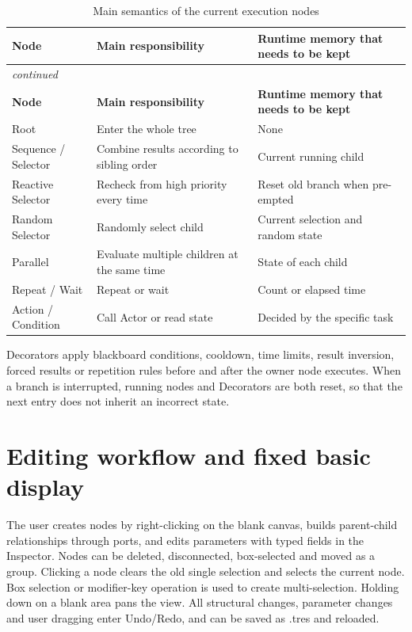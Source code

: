 \documentclass[11pt,a4paper,oneside,extrafontsizes]{memoir}
\begin{document}
\begin{center}

\begin{longtable}{@{}p{} p{} p{}@{}}
\caption{Main semantics of the current execution nodes}\label{tab:runtime-node-semantics}\\
\toprule
\textbf{Node} & \textbf{Main responsibility} & \textbf{Runtime memory that needs to be kept} \\
\midrule
\endfirsthead
\multicolumn{3}{l}{\itshape continued}\\
\toprule
\textbf{Node} & \textbf{Main responsibility} & \textbf{Runtime memory that needs to be kept} \\
\midrule
\endhead
Root & Enter the whole tree & None \\
Sequence / Selector & Combine results according to sibling order & Current running child \\
Reactive Selector & Recheck from high priority every time & Reset old branch when pre-empted \\
Random Selector & Randomly select child & Current selection and random state \\
Parallel & Evaluate multiple children at the same time & State of each child \\
Repeat / Wait & Repeat or wait & Count or elapsed time \\
Action / Condition & Call Actor or read state & Decided by the specific task \\
\bottomrule
\end{longtable}
\end{center}

Decorators apply blackboard conditions, cooldown, time limits, result inversion, forced results or repetition rules before and after the owner node executes. When a branch is interrupted, running nodes and Decorators are both reset, so that the next entry does not inherit an incorrect state.

\section{Editing workflow and fixed basic display}

The user creates nodes by right-clicking on the blank canvas, builds parent-child relationships through ports, and edits parameters with typed fields in the Inspector. Nodes can be deleted, disconnected, box-selected and moved as a group. Clicking a node clears the old single selection and selects the current node. Box selection or modifier-key operation is used to create multi-selection. Holding down on a blank area pans the view. All structural changes, parameter changes and user dragging enter Undo/Redo, and can be saved as .tres and reloaded.
\end{document}
